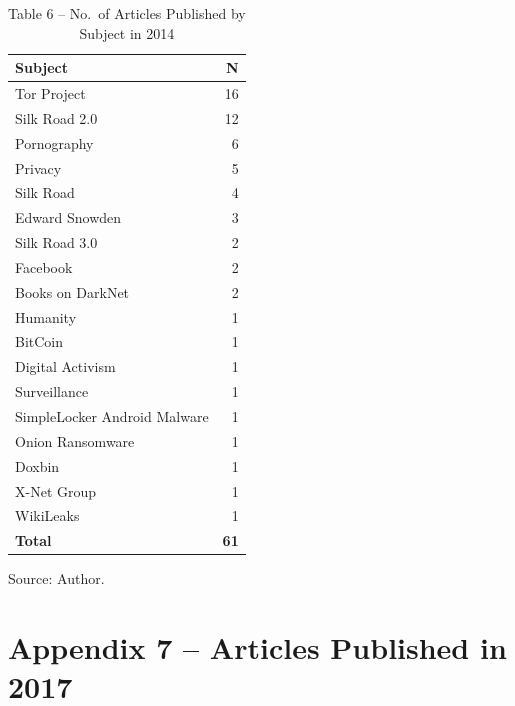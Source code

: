 \begin{table}[h!]
\centering
\caption*{Table 6 -- No.\ of Articles Published by Subject in 2014}
\begin{tabular}{lr}
\toprule
\textbf{Subject} & \textbf{N} \\
\midrule
Tor Project & 16 \\
Silk Road 2.0 & 12 \\
Pornography & 6 \\
Privacy & 5 \\
Silk Road & 4 \\
Edward Snowden & 3 \\
Silk Road 3.0 & 2 \\
Facebook & 2 \\
Books on DarkNet & 2 \\
Humanity & 1 \\
BitCoin & 1 \\
Digital Activism & 1 \\
Surveillance & 1 \\
SimpleLocker Android Malware & 1 \\
Onion Ransomware & 1 \\
Doxbin & 1 \\
X-Net Group & 1 \\
WikiLeaks & 1 \\
\midrule
\textbf{Total} & \textbf{61} \\
\bottomrule
\end{tabular}

\vspace{0.5em}
\noindent Source: Author.
\end{table}

\newpage

\section*{Appendix 7 -- Articles Published in 2017}

